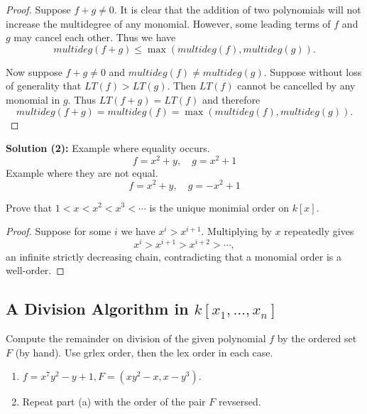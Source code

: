 \begin{proof}
    Suppose $f + g \ne 0$.
    It is clear that the addition of two polynomials will not increase the multidegree 
    of any monomial.
    However, some leading terms of $f$ and $g$ may cancel each other.
    Thus we have 
    \[
    multideg(f + g) \le \max(multideg(f), multideg(g)).
    \]

    Now suppose $f + g \ne 0$ and $multideg(f) \ne multideg(g)$.
    Suppose without loss of generality that $LT(f) > LT(g)$.
    Then $LT(f)$ cannot be cancelled by any monomial in $g$.
    Thus $LT(f+g) = LT(f)$ and therefore
    \[
    multideg(f+g) = multideg(f) 
    = \max(multideg(f), multideg(g)).
    \]
\end{proof}

\textbf{Solution (2):}
Example where equality occurs.
\[
f = x^2 + y,\quad g = x^2 + 1
\]
Example where they are not equal.
\[
f = x^2 + y,\quad g = -x^2 + 1
\]

\begin{tcolorbox}[title=Problem 13, breakable]
    Prove that $1 < x < x^2 < x^3 < \cdots$ is the unique monimial order on $k[x]$.
\end{tcolorbox}

\begin{proof}
    Suppose for some $i$ we have $x^i > x^{i+1}$.
    Multiplying by $x$ repeatedly gives
    \[
    x^i > x^{i+1} > x^{i+2} > \cdots,
    \]
    an infinite strictly decreasing chain, contradicting that a monomial order
    is a well-order. 
\end{proof}

\subsection{A Division Algorithm in $k[x_1, \ldots, x_n]$}

\begin{tcolorbox}[title=Problem 1, breakable]
    Compute the remainder on division of the given polynomial $f$ 
    by the ordered set $F$ (by hand). Use grlex order,
    then the lex order in each case.
    \begin{enumerate}
        \item $f = x^7 y^2 - y + 1, F = (x y^2 - x, x - y^3)$.
        \item Repeat part (a) with the order of the pair $F$ revsersed.
    \end{enumerate}
\end{tcolorbox}

